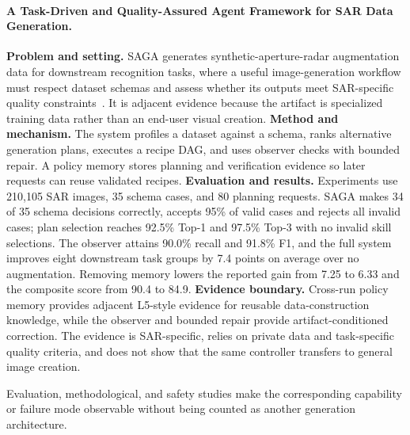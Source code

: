 \paragraph{A Task-Driven and Quality-Assured Agent Framework for SAR Data Generation.}
\textbf{Problem and setting.} SAGA generates synthetic-aperture-radar augmentation data for downstream recognition tasks, where a useful image-generation workflow must respect dataset schemas and assess whether its outputs meet SAR-specific quality constraints~\cite{avg260628896}. It is adjacent evidence because the artifact is specialized training data rather than an end-user visual creation. \textbf{Method and mechanism.} The system profiles a dataset against a schema, ranks alternative generation plans, executes a recipe DAG, and uses observer checks with bounded repair. A policy memory stores planning and verification evidence so later requests can reuse validated recipes. \textbf{Evaluation and results.} Experiments use 210,105 SAR images, 35 schema cases, and 80 planning requests. SAGA makes 34 of 35 schema decisions correctly, accepts 95\% of valid cases and rejects all invalid cases; plan selection reaches 92.5\% Top-1 and 97.5\% Top-3 with no invalid skill selections. The observer attains 90.0\% recall and 91.8\% F1, and the full system improves eight downstream task groups by 7.4 points on average over no augmentation. Removing memory lowers the reported gain from 7.25 to 6.33 and the composite score from 90.4 to 84.9. \textbf{Evidence boundary.} Cross-run policy memory provides adjacent L5-style evidence for reusable data-construction knowledge, while the observer and bounded repair provide artifact-conditioned correction. The evidence is SAR-specific, relies on private data and task-specific quality criteria, and does not show that the same controller transfers to general image creation.

Evaluation, methodological, and safety studies make the corresponding capability or failure mode observable without being counted as another generation architecture.

